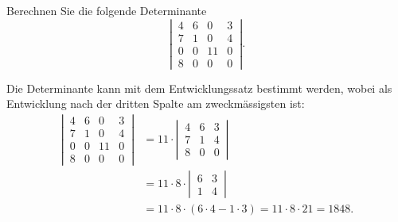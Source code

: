 Berechnen Sie die folgende Determinante
\[
\left|\,\begin{matrix}
4&6& 0&3\\
7&1& 0&4\\
0&0&11&0\\
8&0& 0&0
\end{matrix}\,\right|.
\]


\begin{loesung}
Die Determinante kann mit dem Entwicklungssatz bestimmt werden, wobei
als Entwicklung nach der dritten Spalte am zweckmässigsten ist:
\begin{align*}
\left|\,\begin{matrix}
4&6& 0&3\\
7&1& 0&4\\
0&0&11&0\\
8&0& 0&0
\end{matrix}\,\right|
&=
11\cdot
\left|\,\begin{matrix}
4&6&3\\
7&1&4\\
8&0&0
\end{matrix}\,\right|
\\
&=
11\cdot
8\cdot
\left|\,\begin{matrix}
6&3\\
1&4
\end{matrix}\,\right|
\\
&=
11\cdot
8\cdot
(6\cdot 4-1\cdot 3)=11\cdot 8\cdot 21=1848.
\end{align*}



\end{loesung}
